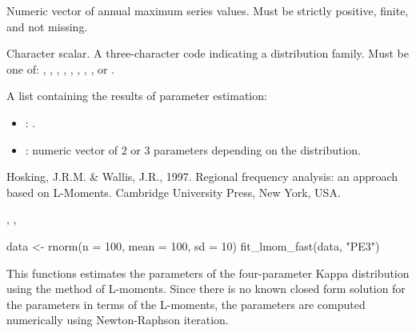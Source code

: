 \documentclass[a4paper]{book}
\begin{document}
%
\begin{Arguments}
\begin{ldescription}
\item[\code{data}] Numeric vector of annual maximum series values.
Must be strictly positive, finite, and not missing.

\item[\code{distribution}] Character scalar. A three-character code indicating
a distribution family. Must be one of: , , ,
, , , , , or .
\end{ldescription}
\end{Arguments}
%
\begin{Value}
A list containing the results of parameter estimation:
\begin{itemize}

\item{} : .
\item{} : numeric vector of 2 or 3 parameters depending on the distribution.

\end{itemize}

\end{Value}
%
\begin{References}
Hosking, J.R.M. \& Wallis, J.R., 1997. Regional frequency analysis: an approach based
on L-Moments. Cambridge University Press, New York, USA.
\end{References}
%
\begin{SeeAlso}
, , 
\end{SeeAlso}
%
\begin{Examples}
\begin{ExampleCode}
data <- rnorm(n = 100, mean = 100, sd = 10)
fit_lmom_fast(data, "PE3")

\end{ExampleCode}
\end{Examples}
%
\begin{Description}
This functions estimates the parameters of the four-parameter Kappa distribution
using the method of L-moments. Since there is no known closed form solution for
the parameters in terms of the L-moments, the parameters are computed numerically
using Newton-Raphson iteration.
\end{Description}
\end{document}
